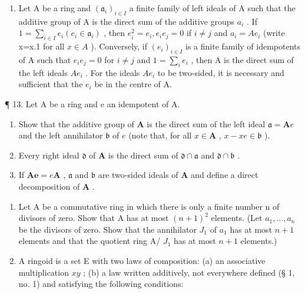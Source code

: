 \begin{enumerate}
\def\labelenumi{\arabic{enumi}.}
\setcounter{enumi}{11}
\tightlist
\item
  Let A be a ring and \((\mathfrak{a}_{i})_{i\in I}\) a finite family of left ideals of A such that the additive group of A is the direct sum of the additive groups \(a_{i}\) . If \(1=\sum_{i\in I}e_{i}(e_{i}\in\mathfrak{a}_{i})\) , then \(e_{i}^{2}=e_{i}, e_{i}e_{j}=0\) if \(i\neq j\) and \(a_{i}=Ae_{i}\) (write x=x.1 for all \(x\in A\) ). Conversely, if \((e_{i})_{i\in I}\) is a finite family of idempotents of A such that \(e_{i}e_{j}=0\) for \(i\neq j\) and \(1=\sum_{i}e_{i}\) , then A is the direct sum of the left ideals \(Ae_{i}\) . For the ideals \(Ae_{i}\) to be two-sided, it is necessary and sufficient that the \(e_{i}\) be in the centre of A.
\end{enumerate}

¶ 13. Let A be a ring and e an idempotent of A.

\begin{enumerate}
\def\labelenumi{(\alph{enumi})}
\item
  Show that the additive group of \(\mathbf{A}\) is the direct sum of the left ideal \(\mathfrak{a} = \mathbf{A}e\) and the left annihilator \(\mathfrak{b}\) of \(e\) (note that, for all \(x\in \mathbf{A}\) , \(x - xe\in \mathfrak{b}\) ).
\item
  Every right ideal \(\mathfrak{d}\) of \(\mathbf{A}\) is the direct sum of \(\mathfrak{d} \cap \mathfrak{a}\) and \(\mathfrak{d} \cap \mathfrak{b}\) .
\item
  If \(\mathbf{Ae} = e\mathbf{A}\) , \(\mathfrak{a}\) and \(\mathfrak{b}\) are two-sided ideals of \(\mathbf{A}\) and define a direct decomposition of \(\mathbf{A}\) .
\end{enumerate}

\begin{enumerate}
\def\labelenumi{\arabic{enumi}.}
\setcounter{enumi}{13}
\item
  Let A be a commutative ring in which there is only a finite number n of divisors of zero. Show that A has at most \((n+1)^{2}\) elements. (Let \(a_{1},\ldots,a_{n}\) be the divisors of zero. Show that the annihilator \(J_{1}\) of \(a_{1}\) has at most \(n+1\) elements and that the quotient ring A/ \(J_{1}\) has at most \(n+1\) elements.)
\item
  A ringoid is a set E with two laws of composition: (a) an associative multiplication \(xy\) ; (b) a law written additively, not everywhere defined (§ 1, no. 1) and satisfying the following conditions:
\end{enumerate}

